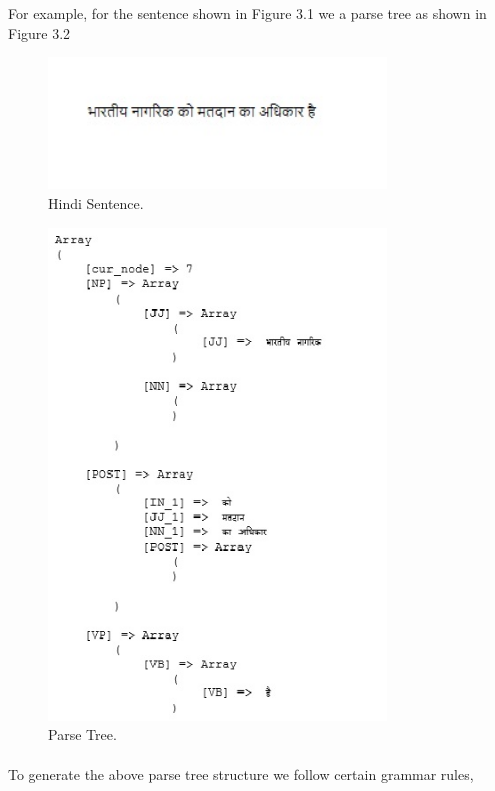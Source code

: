 For example, for the sentence shown in Figure 3.1 we a parse tree as shown in Figure 3.2

\begin{figure}[htb]
\centering
\includegraphics[width=0.8\textwidth]{images/sentence.jpg}
\caption{Hindi Sentence.} 
\label{fig:sentence}
\end{figure}

\begin{figure}[htb]
\centering
\includegraphics[width=0.8\textwidth]{images/parsetree.jpg}
\caption{Parse Tree.} 
\label{fig:parsetree}
\end{figure}

\break

\paragraph{}
To generate the above parse tree structure we follow certain grammar rules, \\

